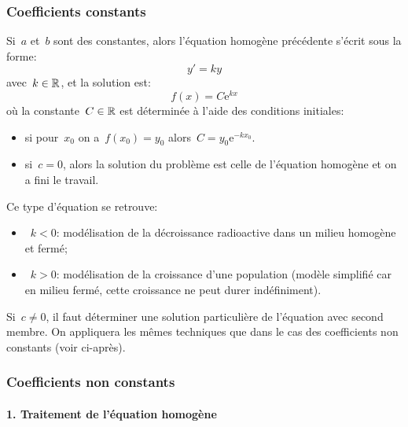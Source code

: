 \medskip
\subsubsection{Coefficients constants} 

Si~$a$ et~$b$ sont des constantes, alors l'équation homogène précédente s'écrit sous la forme:
\begin{equation}
y' = ky
\end{equation}
avec~$k\in\mathbb R$, et la solution est:
\begin{equation}
f(x) = C\mathrm{e}^{kx}
\end{equation}
où la constante~$C\in\mathbb R$ est déterminée à l'aide des conditions initiales:
\begin{itemize}
\item si pour~$x_0$ on a~$f(x_0) = y_0$ alors~$C = y_0\mathrm{e}^{-kx_0}$. 
\item si~$c=0$, alors la solution du problème est celle de l'équation homogène et on a fini le travail.
\end{itemize} 
Ce type d'équation se retrouve: 
\begin{itemize} 
\item~$k<0$: modélisation de la décroissance radioactive dans un milieu homogène et fermé; 
\item~$k>0$: modélisation de la croissance d'une population (modèle simplifié car en milieu fermé, cette croissance ne peut durer indéfiniment). 
\end{itemize} 
Si~$c\ne0$, il faut déterminer une solution particulière de l'équation avec second membre. On appliquera les mêmes techniques que dans le cas des coefficients non constants (voir ci-après). 

\medskip
\subsubsection{Coefficients non constants} 

\paragraph{1. Traitement de l'équation homogène}

